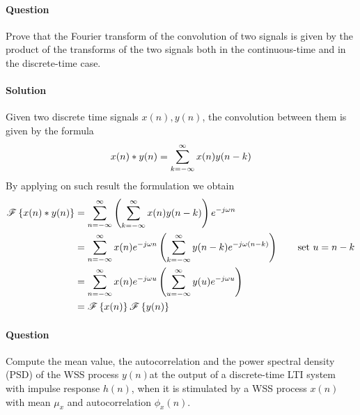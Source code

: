 \newquestion
	\paragraph{Question} Prove that the Fourier transform of the convolution of two signals is given by the product of the transforms of the two signals both in the continuous-time and in the discrete-time case.
	
	\paragraph{Solution} Given two discrete time signals $x(n),y(n)$, the convolution between them is given by the formula
	\[ x(n) * y(n) = \sum_{k=-\infty}^\infty x(n)y(n-k) \]
	By applying on such result the \dtft formulation we obtain
	\begin{align*}
		\mathscr{F}\left\{ x(n)*y(n) \right\} & = \sum_{n=-\infty}^\infty \left( \sum_{k=-\infty}^\infty x(n)y(n-k) \right) e^{-j\omega n} \\
		& = \sum_{n=-\infty}^\infty x(n) e^{-j\omega n} \left( \sum_{k=-\infty}^\infty y(n-k) e^{-j\omega(n-k)} \right) \qquad \textrm{set } u = n-k \\ &  = \sum_{n=-\infty}^\infty x(n) e^{-j\omega u} \left( \sum_{u=-\infty}^\infty y(u) e^{-j\omega u } \right) \\
		& = \mathscr{F}\left\{ x(n) \right\} \mathscr{F}\left\{ y(n) \right\}
	\end{align*}
	
\newquestion
	\paragraph{Question} Compute the mean value, the autocorrelation and the power spectral density (PSD) of the WSS process $y(n)$at the output of a discrete-time LTI system with impulse response $h(n)$, when it is stimulated by a WSS process $x(n)$ with mean $\mu_x$ and autocorrelation $\phi_x(n)$.

	
